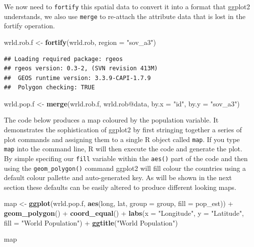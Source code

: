 \documentclass[]{article}
\newenvironment{Shaded}{}{}
\newcommand{\KeywordTok}[1]{\textcolor[rgb]{0.00,0.44,0.13}{\textbf{{#1}}}}
\newcommand{\DataTypeTok}[1]{\textcolor[rgb]{0.56,0.13,0.00}{{#1}}}
\newcommand{\StringTok}[1]{\textcolor[rgb]{0.25,0.44,0.63}{{#1}}}
\newcommand{\NormalTok}[1]{{#1}}
\begin{document}
We now need to \texttt{fortify} this spatial data to convert it into a
format that ggplot2 understands, we also use \texttt{merge} to re-attach
the attribute data that is lost in the fortify operation.

\begin{Shaded}
\begin{Highlighting}[]
\NormalTok{wrld.rob.f <- }\KeywordTok{fortify}\NormalTok{(wrld.rob, }\DataTypeTok{region =} \StringTok{"sov_a3"}\NormalTok{)}
\end{Highlighting}
\end{Shaded}

\begin{verbatim}
## Loading required package: rgeos
## rgeos version: 0.3-2, (SVN revision 413M)
##  GEOS runtime version: 3.3.9-CAPI-1.7.9 
##  Polygon checking: TRUE
\end{verbatim}

\begin{Shaded}
\begin{Highlighting}[]

\NormalTok{wrld.pop.f <- }\KeywordTok{merge}\NormalTok{(wrld.rob.f, wrld.rob@data, }\DataTypeTok{by.x =} \StringTok{"id"}\NormalTok{, }\DataTypeTok{by.y =} \StringTok{"sov_a3"}\NormalTok{)}
\end{Highlighting}
\end{Shaded}

The code below produces a map coloured by the population variable. It
demonstrates the sophistication of ggplot2 by first stringing together a
series of plot commands and assigning them to a single R object called
\texttt{map}. If you type \texttt{map} into the command line, R will
then execute the code and generate the plot. By simple specifing our
\texttt{fill} variable within the \texttt{aes()} part of the code and
then using the \texttt{geom\_polygon()} command ggplot2 will fill colour
the countries using a default colour pallette and auto-generated key. As
will be shown in the next section these defaults can be easily altered
to produce different looking maps.

\begin{Shaded}
\begin{Highlighting}[]
\NormalTok{map <- }\KeywordTok{ggplot}\NormalTok{(wrld.pop.f, }\KeywordTok{aes}\NormalTok{(long, lat, }\DataTypeTok{group =} \NormalTok{group, }\DataTypeTok{fill =} \NormalTok{pop_est)) + }\KeywordTok{geom_polygon}\NormalTok{() + }
    \KeywordTok{coord_equal}\NormalTok{() + }\KeywordTok{labs}\NormalTok{(}\DataTypeTok{x =} \StringTok{"Longitude"}\NormalTok{, }\DataTypeTok{y =} \StringTok{"Latitude"}\NormalTok{, }\DataTypeTok{fill =} \StringTok{"World Population"}\NormalTok{) + }
    \KeywordTok{ggtitle}\NormalTok{(}\StringTok{"World Population"}\NormalTok{)}

\NormalTok{map}
\end{Highlighting}
\end{Shaded}
\end{document}
